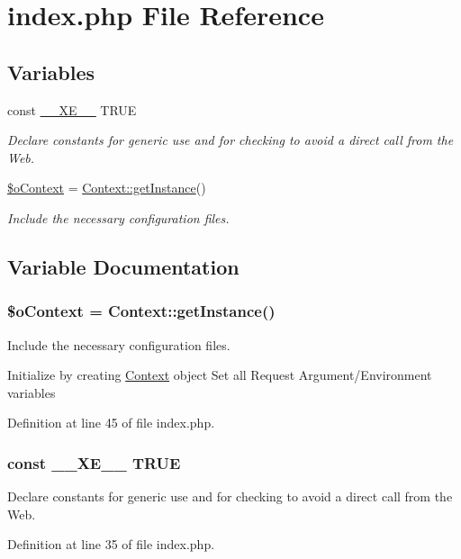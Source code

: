 \hypertarget{index_8php}{\section{index.\+php File Reference}
\label{index_8php}
}
\subsection*{Variables}
\begin{DoxyCompactItemize}
\item 
const \hyperlink{index_8php_a697de427d83b791899ae45d555377756}{\+\_\+\+\_\+\+X\+E\+\_\+\+\_\+} T\+R\+U\+E
\begin{DoxyCompactList}\small\item\em Declare constants for generic use and for checking to avoid a direct call from the Web. \end{DoxyCompactList}\item 
\hyperlink{index_8php_aacfc569bef069a536ba65859b245068b}{\$o\+Context} = \hyperlink{classContext_a399e419617c7fe9b0c9eaf22c431df69}{Context\+::get\+Instance}()
\begin{DoxyCompactList}\small\item\em Include the necessary configuration files. \end{DoxyCompactList}\end{DoxyCompactItemize}


\subsection{Variable Documentation}
\hypertarget{index_8php_aacfc569bef069a536ba65859b245068b}{
\subsubsection[{\$o\+Context}]{\setlength{\rightskip}{0pt plus 5cm}\$o\+Context = {\bf Context\+::get\+Instance}()}}\label{index_8php_aacfc569bef069a536ba65859b245068b}


Include the necessary configuration files. 

Initialize by creating \hyperlink{classContext}{Context} object Set all Request Argument/\+Environment variables 

Definition at line 45 of file index.\+php.

\hypertarget{index_8php_a697de427d83b791899ae45d555377756}{
\subsubsection[{\+\_\+\+\_\+\+X\+E\+\_\+\+\_\+}]{\setlength{\rightskip}{0pt plus 5cm}const \+\_\+\+\_\+\+X\+E\+\_\+\+\_\+ T\+R\+U\+E}}\label{index_8php_a697de427d83b791899ae45d555377756}


Declare constants for generic use and for checking to avoid a direct call from the Web. 



Definition at line 35 of file index.\+php.

